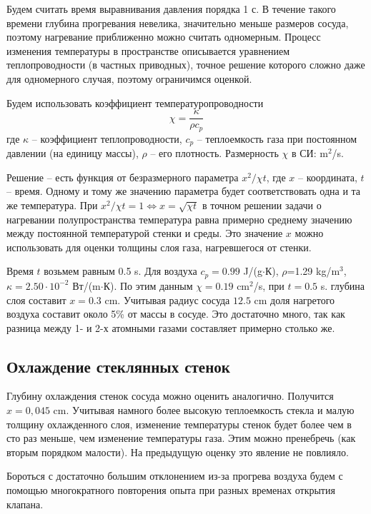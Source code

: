 \documentclass[a4paper,12pt]{report}
\begin{document}
\begin{multicols}{2}
    Будем считать время выравнивания давления порядка 1 с. В течение такого времени глубина прогревания невелика, значительно меньше размеров сосуда, поэтому нагревание приближенно можно считать одномерным. Процесс изменения температуры в пространстве описывается уравнением теплопроводности (в частных приводных), точное решение которого сложно даже для одномерного случая, поэтому ограничимся оценкой.

    Будем использовать коэффициент температуропроводности
    \begin{equation*}
        \chi=\frac{\kappa}{\rho c_p}
    \end{equation*}
    где $\kappa$ -- коэффициент теплопроводности, $c_p$ -- теплоемкость газа при постоянном давлении (на единицу массы), $\rho$ -- его плотность. Размерность $\chi$ в СИ: m$^2$/s.

    Решение -- есть функция от безразмерного параметра $x^2/\chi t$, где $x$ -- координата, $t$ -- время. Одному и тому же значению параметра будет соответствовать одна и та же температура. При $x^2/\chi t=1 \Leftrightarrow x=\sqrt{\chi t}$ в точном решении задачи о нагревании полупространства температура равна примерно среднему значению между постоянной температурой стенки и среды. Это значение $x$ можно использовать для оценки толщины слоя газа, нагревшегося от стенки.
    
    Время $t$ возьмем равным 0.5 s. Для воздуха $c_p=0.99$ J/(g$\cdot$К), $\rho$=1.29 kg/m$^3$, $\kappa=2.50\cdot10^{-2}$ Вт/(m$\cdot$К). По этим данным $\chi=0.19$ cm$^2$/s, при $t=0.5$ s. глубина слоя составит $x=0.3$ cm. Учитывая радиус сосуда $12.5$ cm доля нагретого воздуха составит около 5\% от массы в сосуде. Это достаточно много, так как разница между 1- и 2-х атомными газами составляет примерно столько же.

    \subsection*{Охлаждение стеклянных стенок}
    Глубину охлаждения стенок сосуда можно оценить аналогично. Получится $x=0,045$ cm. Учитывая намного более высокую теплоемкость стекла и малую толщину охлажденного слоя, изменение температуры стенок будет более чем в сто раз меньше, чем изменение температуры газа. Этим можно пренебречь (как вторым порядком малости). На предыдущую оценку это явление не повлияло.

    Бороться с достаточно большим отклонением из-за прогрева воздуха будем с помощью многократного повторения опыта при разных временах открытия клапана.


\end{multicols}
\end{document}
